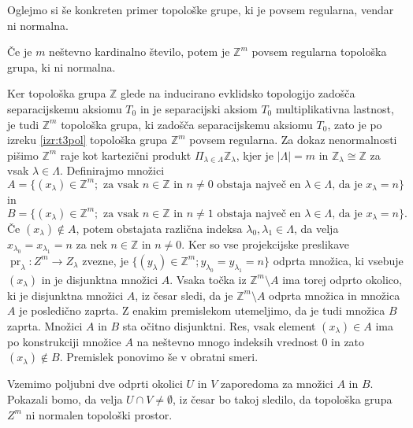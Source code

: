 \documentclass[mat1]{fmfdelo}
\newcommand{\Z}{\mathbb Z}
\DeclareMathOperator{\pr}{pr}
\begin{document}
Oglejmo si še konkreten primer topološke grupe, ki je povsem regularna, vendar ni normalna.

\begin{izrek}\label{izr:t4protiprimer}
Če je $m$ neštevno kardinalno število, potem je $\Z^{m}$ povsem regularna topološka grupa, ki ni normalna.
\end{izrek}

\begin{dokaz}
Ker topološka grupa $\Z$ glede na inducirano evklidsko topologijo zadošča separacijskemu aksiomu $T_0$ in je separacijski aksiom $T_0$ multiplikativna lastnost, je tudi $\Z^m$ topološka grupa, ki zadošča separacijskemu aksiomu $T_0$, zato je po izreku \ref{izr:t3pol} topološka grupa $\Z^m$ povsem regularna. Za dokaz nenormalnosti pišimo $\Z^m$ raje kot kartezični produkt $\Pi_{\lambda \in \Lambda}\Z_\lambda$, kjer je $|\Lambda| = m$ in $\Z_\lambda \cong \Z$ za vsak $\lambda \in \Lambda$. Definirajmo množici
\[ A = \lbrace (x_\lambda) \in \Z^m ; \text{ za vsak $n \in \Z$ in $n \neq 0$ obstaja največ en $\lambda \in \Lambda$, da je $x_\lambda = n$}\rbrace \]
in
\[ B = \lbrace (x_\lambda) \in \Z^m ; \text{ za vsak $n \in \Z$ in $n \neq 1$ obstaja največ en $\lambda \in \Lambda$, da je $x_\lambda = n$}\rbrace. \]
Če $(x_\lambda) \notin A$, potem obstajata različna indeksa $\lambda_0, \lambda_1 \in \Lambda$, da velja $x_{\lambda_0} = x_{\lambda_1} = n$ za nek $n \in \Z$ in $n \neq 0$. Ker so vse projekcijske preslikave $\pr_{\lambda}\colon Z^m \to Z_\lambda$ zvezne, je $\lbrace (y_\lambda) \in \Z^m ; y_{\lambda_0} = y_{\lambda_1} = n \rbrace$ odprta množica, ki vsebuje $(x_\lambda)$ in je disjunktna množici $A$. Vsaka točka iz $\Z^m\setminus A$ ima torej odprto okolico, ki je disjunktna množici $A$, iz česar sledi, da je $\Z^m\setminus A$ odprta množica in množica $A$ je posledično zaprta. Z enakim premislekom utemeljimo, da je tudi množica $B$ zaprta. Množici $A$ in $B$ sta očitno disjunktni. Res, vsak element $(x_\lambda) \in A$ ima po konstrukciji množice $A$ na neštevno mnogo indeksih vrednost $0$ in zato $(x_\lambda) \notin B$. Premislek ponovimo še v obratni smeri.

Vzemimo poljubni dve odprti okolici $U$ in $V$ zaporedoma za množici $A$ in $B$. Pokazali bomo, da velja $U \cap V \neq \emptyset$, iz česar bo takoj sledilo, da topološka grupa $Z^m$ ni normalen topološki prostor.


\end{dokaz}
\end{document}
